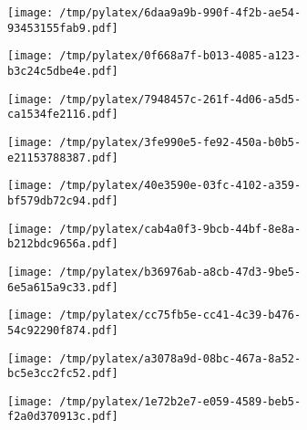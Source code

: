 \documentclass{article}
\begin{document}
\begin{figure}[htbp]
\begin{subfigure}[b]{.3\linewidth}
\texttt{[image: /tmp/pylatex/6daa9a9b-990f-4f2b-ae54-93453155fab9.pdf]}
\end{subfigure}
\begin{subfigure}[b]{.3\linewidth}
\texttt{[image: /tmp/pylatex/0f668a7f-b013-4085-a123-b3c24c5dbe4e.pdf]}
\end{subfigure}
\begin{subfigure}[b]{.3\linewidth}
\texttt{[image: /tmp/pylatex/7948457c-261f-4d06-a5d5-ca1534fe2116.pdf]}
\end{subfigure}
\begin{subfigure}[b]{.3\linewidth}
\texttt{[image: /tmp/pylatex/3fe990e5-fe92-450a-b0b5-e21153788387.pdf]}
\end{subfigure}
\begin{subfigure}[b]{.3\linewidth}
\texttt{[image: /tmp/pylatex/40e3590e-03fc-4102-a359-bf579db72c94.pdf]}
\end{subfigure}
\begin{subfigure}[b]{.3\linewidth}
\texttt{[image: /tmp/pylatex/cab4a0f3-9bcb-44bf-8e8a-b212bdc9656a.pdf]}
\end{subfigure}
\begin{subfigure}[b]{.3\linewidth}
\texttt{[image: /tmp/pylatex/b36976ab-a8cb-47d3-9be5-6e5a615a9c33.pdf]}
\end{subfigure}
\begin{subfigure}[b]{.3\linewidth}
\texttt{[image: /tmp/pylatex/cc75fb5e-cc41-4c39-b476-54c92290f874.pdf]}
\end{subfigure}
\begin{subfigure}[b]{.3\linewidth}
\texttt{[image: /tmp/pylatex/a3078a9d-08bc-467a-8a52-bc5e3cc2fc52.pdf]}
\end{subfigure}
\begin{subfigure}[b]{.3\linewidth}
\texttt{[image: /tmp/pylatex/1e72b2e7-e059-4589-beb5-f2a0d370913c.pdf]}
\end{subfigure}
\end{figure}
\end{document}
